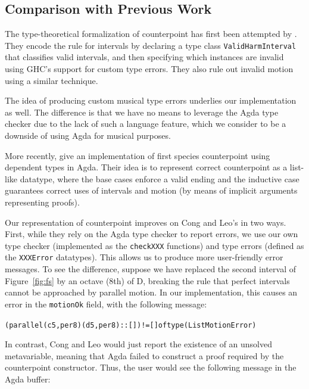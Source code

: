 \subsection{Comparison with Previous Work}
\label{sec:cp:comp}

The type-theoretical formalization of counterpoint has first been
attempted by \citet{szamozvancev-welltyped}.
They encode the rule for intervals by declaring a type class
\texttt{ValidHarmInterval} that classifies valid intervals, and then
specifying which instances are invalid using GHC's support for
custom type errors.
They also rule out invalid motion using a similar technique.

The idea of producing custom musical type errors underlies our
implementation as well.
The difference is that we have no means to leverage the Agda
type checker due to the lack of such a language feature, which
we consider to be a downside of using Agda for musical purposes.

More recently, \citet{cong-cp} give an implementation of first
species counterpoint using dependent types in Agda.
Their idea is to represent correct counterpoint as a list-like
datatype, where the base cases enforce a valid ending and the
inductive case guarantees correct uses of intervals and motion
(by means of implicit arguments representing proofs).

Our representation of counterpoint improves on Cong and Leo's
in two ways.
First, while they rely on the Agda type checker to report errors,
we use our own type checker (implemented as the
\texttt{checkXXX} functions) and type errors (defined as the
\texttt{XXXError} datatypes).
This allows us to produce more user-friendly error messages.
To see the difference, suppose we have replaced the second interval
of Figure~\ref{fig:fs} by an octave (8th) of D, breaking the rule
that perfect intervals cannot be approached by parallel motion.
In our implementation, this causes an error in the \texttt{motionOk}
field, with the following message:

\begin{alltt}
(parallel (c 5 , per8) (d 5 , per8) :: []) != [] of type (List MotionError)
\end{alltt}

\noindent In contrast, Cong and Leo would just report the existence
of an unsolved metavariable, meaning that Agda failed to construct
a proof required by the counterpoint constructor.
Thus, the user would see the following message in the Agda buffer:

